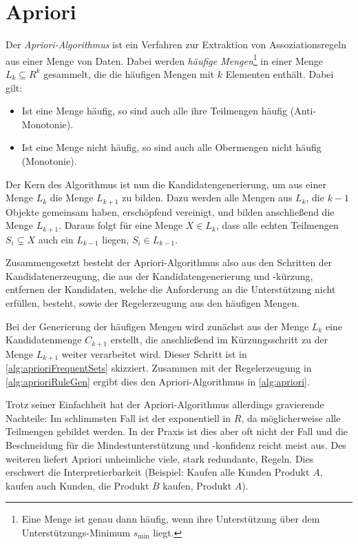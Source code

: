 	\section{Apriori}
		Der \emph{Apriori-Algorithmus} ist ein Verfahren zur Extraktion von Assoziationsregeln aus einer Menge von Daten. Dabei werden \emph{häufige Mengen}\footnote{Eine Menge ist genau dann häufig, wenn ihre Unterstützung über dem Unterstützungs-Minimum \(s_\mathrm{min}\) liegt.} in einer Menge \( L_k \subseteq R^k \) gesammelt, die die häufigen Mengen mit \(k\) Elementen enthält. Dabei gilt:
		\begin{itemize}
			\item Ist eine Menge häufig, so sind auch alle ihre Teilmengen häufig (Anti-Monotonie).
			\item Ist eine Menge nicht häufig, so sind auch alle Obermengen nicht häufig (Monotonie).
		\end{itemize}
		Der Kern des Algorithmus ist nun die Kandidatengenerierung, um aus einer Menge \(L_k\) die Menge \(L_{k + 1}\) zu bilden. Dazu werden alle Mengen aus \(L_k\), die \(k - 1\) Objekte gemeinsam haben, erschöpfend vereinigt, und bilden anschließend die Menge \(L_{k + 1}\). Daraus folgt für eine Menge \( X \in L_k \), dass alle echten Teilmengen \( S_i \subsetneq X \) auch ein \(L_{k - 1}\) liegen, \dh \( S_i \in L_{k - 1} \).

		Zusammengesetzt besteht der Apriori-Algorithmus also aus den Schritten der Kandidatenerzeugung, die aus der Kandidatengenerierung und -kürzung, \dh entfernen der Kandidaten, welche die Anforderung an die Unterstützung nicht erfüllen, besteht, sowie der Regelerzeugung aus den häufigen Mengen.

		Bei der Generierung der häufigen Mengen wird zunächst aus der Menge \(L_k\) eine Kandidatenmenge \(C_{k + 1}\) erstellt, die anschließend im Kürzungsschritt zu der Menge \(L_{k + 1}\) weiter verarbeitet wird. Dieser Schritt ist in \autoref{alg:aprioriFrequentSets} skizziert. Zusammen mit der Regelerzeugung in \autoref{alg:aprioriRuleGen} ergibt dies den Apriori-Algorithmus in \autoref{alg:apriori}.

		Trotz seiner Einfachheit hat der Apriori-Algorithmus allerdings gravierende Nachteile: Im schlimmsten Fall ist der exponentiell in \(R\), da möglicherweise alle Teilmengen gebildet werden. In der Praxis ist dies aber oft nicht der Fall und die Beschneidung für die Mindestunterstützung und -konfidenz reicht meist aus. Des weiteren liefert Apriori unheimliche viele, stark redundante, Regeln. Dies erschwert die Interpretierbarkeit (Beispiel: Kaufen alle Kunden Produkt \(A\), kaufen auch Kunden, die Produkt \(B\) kaufen, Produkt \(A\)).


